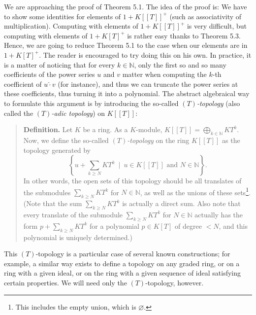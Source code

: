 \documentclass[numbers=enddot,12pt,final,onecolumn,notitlepage]{scrartcl}%
\begin{document}
We are approaching the proof of Theorem 5.1. The idea of the proof is: We have
to show some identities for elements of $1+K\left[  \left[  T\right]  \right]
^{+}$ (such as associativity of multiplication). Computing with elements of
$1+K\left[  \left[  T\right]  \right]  ^{+}$ is very difficult, but computing
with elements of $1+K\left[  T\right]  ^{+}$ is rather easy thanks to Theorem
5.3. Hence, we are going to reduce Theorem 5.1 to the case when our elements
are in $1+K\left[  T\right]  ^{+}$. The reader is encouraged to try doing this
on his own. In practice, it is a matter of noticing that for every
$k\in\mathbb{N}$, only the first so and so many coefficients of the power
series $u$ and $v$ matter when computing the $k$-th coefficient of
$u\widehat{\cdot}v$ (for instance), and thus we can truncate the power series
at these coefficients, thus turning it into a polynomial. The abstract
algebraical way to formulate this argument is by introducing the so-called
$\left(  T\right)  $\textit{-topology} (also called the $\left(  T\right)
$\textit{-adic topology}) on $K\left[  \left[  T\right]  \right]  $:

\begin{quote}
\textbf{Definition.} Let $K$ be a ring. As a $K$-module, $K\left[  \left[
T\right]  \right]  =\bigoplus\limits_{k\in\mathbb{N}}KT^{k}$. Now, we define
the so-called $\left(  T\right)  $\textit{-topology} on the ring $K\left[
\left[  T\right]  \right]  $ as the topology generated by%
\[
\left\{  u+\sum_{k\geq N}KT^{k}\ \mid\ u\in K\left[  \left[  T\right]
\right]  \text{ and }N\in\mathbb{N}\right\}  .
\]
In other words, the open sets of this topology should be all translates of the
submodules $\sum\limits_{k\geq N}KT^{k}$ for $N\in\mathbb{N}$, as well as the
unions of these sets\footnote{This includes the empty union, which is
$\varnothing$.}. (Note that the sum $\sum\limits_{k\geq N}KT^{k}$ is actually
a direct sum. Also note that every translate of the submodule $\sum
\limits_{k\geq N}KT^{k}$ for $N\in\mathbb{N}$ actually has the form
$p+\sum\limits_{k\geq N}KT^{k}$ for a polynomial $p\in K\left[  T\right]  $ of
degree $<N$, and this polynomial is uniquely determined.)
\end{quote}

This $\left(  T\right)  $-topology is a particular case of several known
constructions; for example, a similar way exists to define a topology on any
graded ring, or on a ring with a given ideal, or on the ring with a given
sequence of ideal satisfying certain properties. We will need only the
$\left(  T\right)  $-topology, however.
\end{document}
